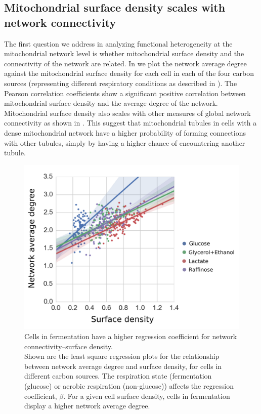 \subsection{Mitochondrial surface density scales with network connectivity}
The first question we address in analyzing functional heterogeneity at the mitochondrial network level is whether mitochondrial surface density and the connectivity of the network are related. In  we plot the network average degree against the mitochondrial surface density for each cell in each of the four carbon sources (representing different respiratory conditions as described in ). The Pearson correlation coefficients show a significant positive correlation between mitochondrial surface density and the average degree of the network. Mitochondrial surface density also scales with other measures of global network connectivity as shown in . This suggest that mitochondrial tubules in cells with a dense mitochondrial network have a higher probability of forming connections with other tubules, simply by having a higher chance of encountering another tubule.
%
\begin{figure}[htp]
	\centering
    \hspace*{.75in}\includegraphics[width=.75\textwidth]{regbeta}
    \caption[Cells in fermentation have a higher regression coefficient for network connectivity--surface density ]{Cells in fermentation have a higher regression coefficient for network connectivity--surface density.\\Shown are the least square regression plots for the relationship between network average degree and surface density, for cells in different carbon sources. The respiration state (fermentation (glucose) or aerobic respiration (non-glucose)) affects the regression coefficient, $\beta$. For a given cell surface density, cells in fermentation display a higher network average degree.}\label{fig:regbeta}
\end{figure}
%

